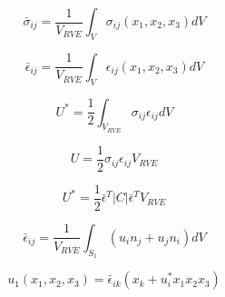 
\begin{equation}\label{Somireddy}
\bar{\sigma}_{ij}=\frac{1}{V_{RVE}}\int_V \sigma_{ij}(x_1,x_2,x_3)dV \end{equation}

\begin{equation}\label{Somireddy2}
\bar{\epsilon}_{ij}=\frac{1}{V_{RVE}}\int_V \epsilon_{ij}(x_1,x_2,x_3)dV
\end{equation}

\begin{equation}\label{Strainenergy}
U^*=\frac{1}{2} \int_{V_{RVE}} \sigma_{ij} \epsilon_{ij} dV
\end{equation}


\begin{equation}\label{Strainenergy2}
U=\frac{1}{2} \sigma_{ij} \epsilon_{ij} V_{RVE}
\end{equation}


\begin{equation}\label{Strainenergy3}
U^*=\frac{1}{2} \bar{\epsilon}^T |C| \bar{\epsilon}^T V_{RVE}
\end{equation}


\begin{equation}\label{averagestrains}
\bar{\epsilon}_{ij}=\frac{1}{V_{RVE}}\int_{S_1} (u_i n_j+u_j n_i) dV
\end{equation}

\begin{equation}\label{displacementfield}
u_1(x_1, x_2, x_3)=\bar{\epsilon}_{ik} (x_k +u_i^*x_1 x_2 x_3)
\end{equation}


